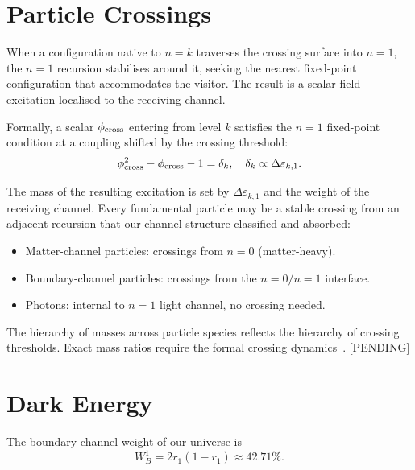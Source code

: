 \documentclass[prd,twocolumn,preprintnumbers,amsmath,amssymb]{revtex4-2}
\newcommand{\pending}{\textcolor{red!70!black}{[PENDING]}}
\begin{document}
\section{Particle Crossings}
\label{sec:crossings}

When a configuration native to $n=k$ traverses the crossing surface
into $n=1$, the $n=1$ recursion stabilises around it, seeking the
nearest fixed-point configuration that accommodates the visitor.  The
result is a scalar field excitation localised to the receiving channel.

Formally, a scalar $\phi_{\rm cross}$ entering from level $k$ satisfies
the $n=1$ fixed-point condition at a coupling shifted by the crossing
threshold:
\begin{equation}
  \phi_{\rm cross}^2 - \phi_{\rm cross} - 1 = \delta_k,
  \quad
  \delta_k \propto \Delta\varepsilon_{k,1}.
  \label{eq:crossing_fp}
\end{equation}

The mass of the resulting excitation is set by $\Delta\varepsilon_{k,1}$
and the weight of the receiving channel.  Every fundamental particle
may be a stable crossing from an adjacent recursion that our channel
structure classified and absorbed:
\begin{itemize}
  \item Matter-channel particles: crossings from $n=0$ (matter-heavy).
  \item Boundary-channel particles: crossings from the $n=0/n=1$
        interface.
  \item Photons: internal to $n=1$ light channel, no crossing needed.
\end{itemize}

The hierarchy of masses across particle species reflects the hierarchy
of crossing thresholds.  Exact mass ratios require the formal crossing
dynamics~\cite{Shields2026b}.  \pending

\section{Dark Energy}
\label{sec:darkenergy}

The boundary channel weight of our universe is
\begin{equation}
  W_B^1 = 2r_1(1-r_1) \approx 42.71\%.
  \label{eq:WB1}
\end{equation}
\end{document}
